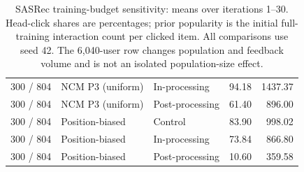 \begin{table}[htbp!]
\begin{tabular}{lllrr}
300 / 804 & NCM P3 (uniform) & In-processing & 94.18 & 1437.37 \\
300 / 804 & NCM P3 (uniform) & Post-processing & 61.40 & 896.00 \\
300 / 804 & Position-biased & Control & 83.90 & 998.02 \\
300 / 804 & Position-biased & In-processing & 73.84 & 866.80 \\
300 / 804 & Position-biased & Post-processing & 10.60 & 359.58 \\
\hline
\end{tabular}
\caption{SASRec training-budget sensitivity: means over iterations 1--30. Head-click shares are percentages; prior popularity is the initial full-training interaction count per clicked item. All comparisons use seed 42. The 6,040-user row changes population and feedback volume and is not an isolated population-size effect.}
\label{chap:results:tab:appendix_epoch_budget_summary}
\end{table}
